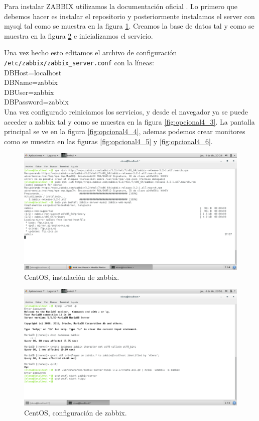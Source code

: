 Para instalar ZABBIX utilizamos la documentación oficial \cite{zabbix}. Lo primero que debemos hacer es instalar el repositorio y posteriormente instalamos el server con mysql tal como se muestra en la figura \ref{fig:opcional4_1}. Creamos la base de datos tal y como se muestra en la figura \ref{fig:opcional4_2} e inicializamos el servicio.

Una vez hecho esto editamos el archivo de configuración \texttt{/etc/zabbix/zabbix\_server.conf} con la líneas: \\
DBHost=localhost\\
DBName=zabbix\\
DBUser=zabbix\\
DBPassword=zabbix\\

Una vez configurado reiniciamos los servicios, y desde el navegador ya se puede acceder a zabbix tal y como se muestra en la figura \ref{fig:opcional4_3}. La pantalla principal se ve en la figura \ref{fig:opcional4_4}, ademas podemos crear monitores como se muestra en las figuras \ref{fig:opcional4_5} y \ref{fig:opcional4_6}.

\begin{figure}[H] 
	\centering
	\includegraphics[width=14.7cm]{./img/opcional4_1.png} 	
	\caption{CentOS, instalación de zabbix.} \label{fig:opcional4_1}
\end{figure}

\begin{figure}[H] 
	\centering
	\includegraphics[width=14.7cm]{./img/opcional4_2.png} 	
	\caption{CentOS, configuración de zabbix.} \label{fig:opcional4_2}
\end{figure}


